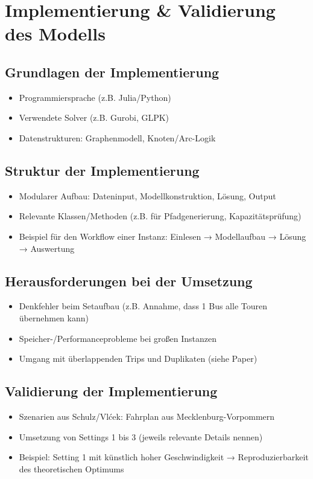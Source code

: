 \chapter{Implementierung \& Validierung des Modells}
\section{Grundlagen der Implementierung}
\begin{itemize}
    \item Programmiersprache (z.B. Julia/Python)
    \item Verwendete Solver (z.B. Gurobi, GLPK)
    \item Datenstrukturen: Graphenmodell, Knoten/Arc-Logik
\end{itemize}

\section{Struktur der Implementierung}
\begin{itemize}
    \item Modularer Aufbau: Dateninput, Modellkonstruktion, Lösung, Output
    \item Relevante Klassen/Methoden (z.B. für Pfadgenerierung, Kapazitätsprüfung)
    \item Beispiel für den Workflow einer Instanz: Einlesen → Modellaufbau → Lösung → Auswertung
\end{itemize}


\section{Herausforderungen bei der Umsetzung}
\begin{itemize}
    \item Denkfehler beim Setaufbau (z.B. Annahme, dass 1 Bus alle Touren übernehmen kann)
    \item Speicher-/Performanceprobleme bei großen Instanzen
    \item Umgang mit überlappenden Trips und Duplikaten (siehe Paper)
\end{itemize}


\section{Validierung der Implementierung} %
\begin{itemize}
    \item Szenarien aus Schulz/Vlćek: Fahrplan aus Mecklenburg-Vorpommern
    \item Umsetzung von Settings 1 bis 3 (jeweils relevante Details nennen)
    \item Beispiel: Setting 1 mit künstlich hoher Geschwindigkeit → Reproduzierbarkeit des theoretischen Optimums
\end{itemize}

